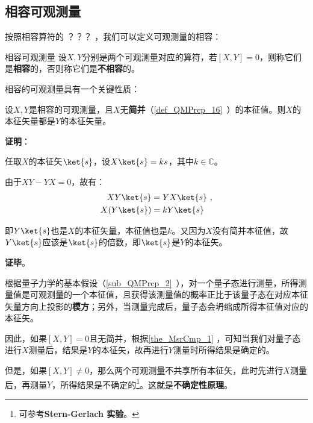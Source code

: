 


\subsection{相容可观测量}



按照相容算符的 ？？？
，我们可以定义可观测量的相容：

\begin{definition}{相容可观测量}
设$X, Y$分别是两个可观测量对应的算符，若$[X, Y]=0$，则称它们是\textbf{相容}的，否则称它们是\textbf{不相容}的。
\end{definition}

相容的可观测量具有一个关键性质：

\begin{theorem}{}\label{the_MsrCmp_1}
设$X, Y$是相容的可观测量，且$X$无\textbf{简并}（\autoref{def_QMPrcp_16}~）的本征值。则$X$的本征矢量都是$Y$的本征矢量。
\end{theorem}

\textbf{证明}：

任取$X$的本征矢$\ket{s}$，设$X\ket{s}=ks$，其中$k\in\mathbb{C}$。

由于$XY-YX=0$，故有：
\begin{equation}
\begin{aligned}
XY\ket{s} &= YX\ket{s}~,\\
X(Y\ket{s}) &= kY\ket{s}
\end{aligned}
\end{equation}

即$Y\ket{s}$也是$X$的本征矢量，本征值也是$k$。又因为$X$没有简并本征值，故$Y\ket{s}$应该是$\ket{s}$的倍数，即$\ket{s}$是$Y$的本征矢。

\textbf{证毕}。


根据量子力学的基本假设（\autoref{sub_QMPrcp_2}~），对一个量子态进行测量，所得测量值是可观测量的一个本征值，且获得该测量值的概率正比于该量子态在对应本征矢量方向上投影的\textbf{模方}；另外，当测量完成后，量子态会坍缩成所得本征值对应的本征矢。

因此，如果$[X, Y]=0$且无简并，根据\autoref{the_MsrCmp_1} ，可知当我们对量子态进行$X$测量后，结果是$Y$的本征矢，故再进行$Y$测量时所得结果是确定的。

但是，如果$[X, Y]\neq 0$，那么两个可观测量不共享所有本征矢，此时先进行$X$测量后，再测量$Y$，所得结果是不确定的\footnote{可参考\textbf{Stern-Gerlach 实验}。}。这就是\textbf{不确定性原理}。



